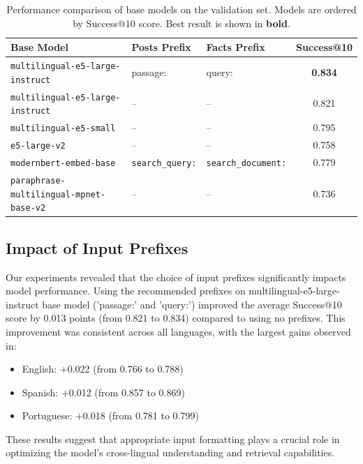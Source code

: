 \documentclass[11pt]{article}
\begin{document}
\begin{table}[t]
  \centering
  \small
  \begin{tabular}{p{5cm}p{3cm}p{3cm}c}
    \hline
    \textbf{Base Model} & \textbf{Posts Prefix} & \textbf{Facts Prefix} & \textbf{Success@10} \\
    \hline
    \texttt{multilingual-e5-large-instruct} \cite{wang2024multilingual} & passage: & query: & \textbf{0.834} \\
    \texttt{multilingual-e5-large-instruct} \cite{wang2024multilingual} & -- & -- & 0.821 \\
    \texttt{multilingual-e5-small} \cite{wang2024multilingual} & -- & -- & 0.795 \\
    \texttt{e5-large-v2} \cite{wang2022text} & -- & -- & 0.758 \\
    \texttt{modernbert-embed-base} \cite{nussbaum2024nomic} & \texttt{search\_query:} & \texttt{search\_document:} & 0.779 \\
    \texttt{paraphrase-multilingual-mpnet-base-v2} \cite{reimers2019sentence} & -- & -- & 0.736 \\
    \hline
  \end{tabular}
  \caption{Performance comparison of base models on the validation set. Models are ordered by Success@10 score. Best result is shown in \textbf{bold}.}
  \label{tab:base-models}
\end{table}

\subsection{Impact of Input Prefixes}

Our experiments revealed that the choice of input prefixes significantly impacts model performance. Using the recommended prefixes on multilingual-e5-large-instruct base model ('passage:' and 'query:') improved the average Success@10 score by 0.013 points (from 0.821 to 0.834) compared to using no prefixes. This improvement was consistent across all languages, with the largest gains observed in:

\begin{itemize}
    \item English: +0.022 (from 0.766 to 0.788)
    \item Spanish: +0.012 (from 0.857 to 0.869)
    \item Portuguese: +0.018 (from 0.781 to 0.799)
\end{itemize}

These results suggest that appropriate input formatting plays a crucial role in optimizing the model's cross-lingual understanding and retrieval capabilities.
\end{document}
